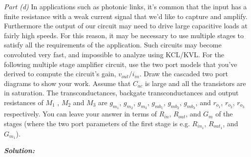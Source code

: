 \documentclass[12pt, fleqn]{article}
\begin{document}
\vspace{0.5cm}
\noindent
\textit{Part (d)}  In applications such as photonic links, it’s common that the input has a finite resistance with a weak current signal that we’d like to capture and amplify. Furthermore the output of our circuit may need to drive large capacitive loads at fairly high speeds. For this reason, it may be necessary to use multiple stages to satisfy all the requirements of the application. Such
circuits may become convoluted very fast, and impossible to analyze using KCL/KVL. For the following multiple stage amplifier circuit, use the two port models that you’ve derived to compute the circuit’s gain, $v_{out}/i_{in}$.  Draw the cascaded two port diagrams to show your work. Assume that $C_{ac}$ is large and all the transistors are in saturation. The transconductances, backgate transconductances and output resistances of $M_1$ , $M_2$ and $M_3$ are $g_{m_1}$, $g_{m_2}$, $g_{m_3}$, $g_{{mb}_1}$, $g_{{mb}_2}$, $g_{{mb}_3}$, and $r_{o_1}$, $r_{o_2}$, $r_{o_3}$ respectively. You can leave your answer in terms of $R_{in}$, $R_{out}$, and $G_m$ of the stages (where the two port parameters of the first stage is e.g. $R_{{in}_1}$, $R_{{out}_1}$, and $G_{m_1}$).

\newpage
\noindent
\textbf{\emph{Solution: }}
\end{document}
